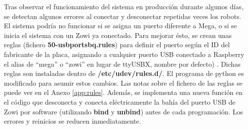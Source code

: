 Tras observar el funcionamiento del sistema en producción durante algunos días, se detectan algunos errores al conectar y desconectar repetidas veces los robots. El sistema podría no funcionar si se asigna un puerto diferente a Mega, o si se inicia el sistema con un Zowi ya conectado. Para mejorar ésto, se crean unas reglas (fichero \textbf{50-usbportsbq.rules}) para definir el puerto según el ID del fabricante de la placa, asignando a cualquier puerto USB conectado a Raspberry el alias de “mega” o “zowi” en lugar de ttyUSBX, nombre por defecto) . Dichas reglas son instaladas dentro de \textbf{/etc/udev/rules.d/}. El programa de python es modificado para asumir estos cambios. Las notas sobre el fichero de las reglas se puede ver en el Anexo \ref{app:rules}. Además, se implementa una nueva función en el código que desconecta y conecta eléctricamente la bahía del puerto USB de Zowi por software (utilizando \textbf{bind} y \textbf{unbind}) antes de cada programación. Los errores y reinicios se reducen inmediatamente.
